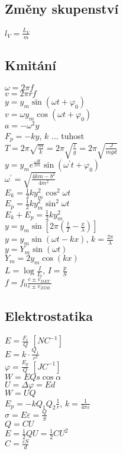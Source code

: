\documentclass{article}
\begin{document}
\subsection*{Změny skupenství}
\begin{multicols}{2}
  \noindent $l_V=\frac{L_V}{m}$\\
\end{multicols}

\subsection*{Kmitání}
\begin{multicols}{3}
\noindent$\omega = 2\pi f$ \\
$v = 2\pi r f$ \\
$y = y_m\sin{(\omega t + \varphi_0)}$\\
$v = \omega y_m\cos{(\omega t + \varphi_0)}$\\
$a = -\omega^2y$\\
$F_p = -ky$, $k$ ... tuhost\\
$T=2\pi\sqrt{\frac{m}{k}}=2\pi\sqrt{\frac{l}{g}}=2\pi\sqrt{\frac{J}{mgd}}$\\
$y=y_me^\frac{-bt}{2m}\sin{(\omega^\prime t + \varphi_0)}$\\
$\omega^\prime = \sqrt{\frac{4km-b^2}{4m^2}}$\\
$E_k = \frac{1}{2}ky_m^2\cos^2{\omega t}$\\
$E_p = \frac{1}{2}ky_m^2\sin^2{\omega t}$ \\
$E_k + E_p = \frac{1}{2}ky_m^2$\\
$y=y_m\sin{\left[2\pi\left(\frac{t}{T}-\frac{x}{\lambda}\right)\right]}$\\
$y=y_m\sin{(\omega t-kx)}$, $k=\frac{2\pi}{\lambda}$\\
$y = Y_m\sin{(\omega t)}$\\
$Y_m = 2y_m\cos{(kx)}$\\
$L = \log{\frac{I}{I_0}}$, $I=\frac{p}{S}$\\
$f = f_0 \frac{c \pm v_{DET.}}{c\pm v_{ZDR.}}$
\end{multicols}

\subsection*{Elektrostatika}
\begin{multicols}{3}
\noindent $E=\frac{F_e}{Q}$ $[NC^{-1}]$\\
$E = k\cdot \frac{Q_1}{r^2}$\\
$\varphi = \frac{E_p}{Q}$ $[JC^{-1}]$\\
$W = EQs\cos \alpha$\\
$U=\Delta\varphi=Ed$\\
$W=UQ$\\
$E_p=-kQ_1Q_2 \frac{1}{r}$, $k=\frac{1}{4\pi \varepsilon}$\\
$\sigma = E\varepsilon = \frac{Q}{S}$\\
$Q=CU$\\
$E = \frac{1}{2}QU=\frac{1}{2}CU^2$\\
$C=\frac{\varepsilon S}{d}$
\end{multicols}
\end{document}
